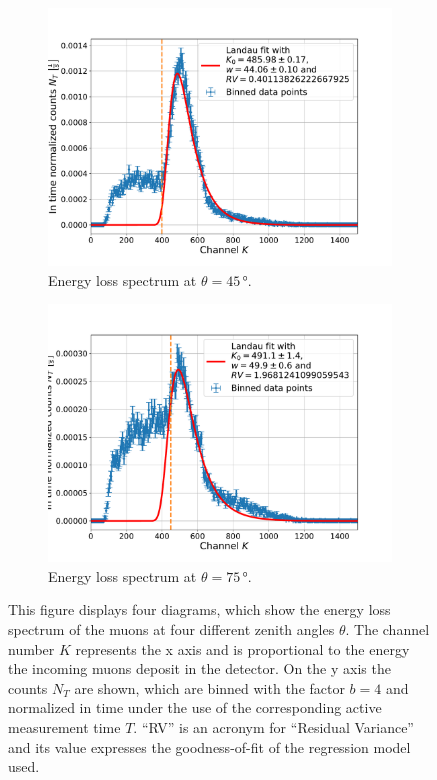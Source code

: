 \begin{figure}[H]
\begin{subfigure}[t]{0.495\textwidth}
		\label{EnergySpectrumAt30Degrees}
	\end{subfigure}
	\begin{subfigure}[t]{0.495\textwidth}
		\centering
		\includegraphics[width=\textwidth]{src/EnergySpectrumAt45Degrees}
		\caption{Energy loss spectrum at $\theta =45\,$°.}
		\label{EnergySpectrumAt45Degrees}
	\end{subfigure}
	\begin{subfigure}[t]{0.495\textwidth}
		\centering
		\includegraphics[width=\textwidth]{src/EnergySpectrumAt75Degrees}
		\caption{Energy loss spectrum at $\theta =75\,$°.}
		\label{EnergySpectrumAt75Degrees}
	\end{subfigure}
	\caption{This figure displays four diagrams, which show the energy loss spectrum of the muons at four different zenith angles $\theta$. The channel number $K$ represents the x axis and is proportional to the energy the incoming muons deposit in the detector. On the y axis the counts $N_T$ are shown, which are binned with the factor $b=4$ and normalized in time under the use of the corresponding active measurement time $T$. \enquote{RV} is an acronym for \enquote{Residual Variance} and its value expresses the goodness-of-fit of the regression model used.}
	\label{EnergySpectrum}
\end{figure}
